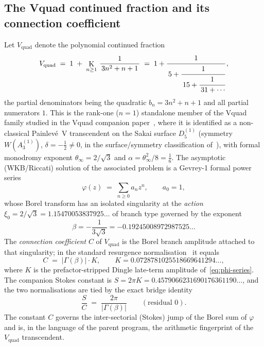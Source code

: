 \documentclass[11pt,reqno]{amsart}
\renewcommand{\_}{\vquadorigunderscore\allowbreak}
\theoremstyle{plain}
\theoremstyle{definition}
\newcommand{\Vquad}{V_{\mathrm{quad}}}
\newcommand{\xizero}{\xi_0}
\providecommand{\C}{}\renewcommand{\C}{C}
\DeclareMathOperator*{\K}{K}
\begin{document}
\subsection{The V\_quad continued fraction and its connection coefficient}
Let $\Vquad$ denote the polynomial continued fraction
\begin{equation}\label{eq:vquad-pcf}
  \Vquad \;=\; 1 \;+\; \K_{n\ge 1}\,\frac{1}{\,3n^{2}+n+1\,}
  \;=\; 1+\cfrac{1}{\,5+\cfrac{1}{\,15+\cfrac{1}{\,31+\cdots}}}\,,
\end{equation}
the partial denominators being the quadratic $b_n=3n^2+n+1$ and all partial numerators $1$.
This is the rank-one ($n=1$) standalone member of the V\_quad family studied in the V\_quad
companion paper~\cite{Vquad}, where it is identified as a non-classical Painlev\'e~V
transcendent on the Sakai surface $D_5^{(1)}$ (symmetry $W(A_3^{(1)})$, $\delta=-\tfrac12\ne0$,
in the surface/symmetry classification of~\cite{SakaiClass}),
with formal monodromy exponent $\theta_\infty=2/\sqrt3$ and $\alpha=\theta_\infty^2/8=\tfrac16$.
The asymptotic (WKB/Riccati) solution of the associated problem is a Gevrey-1 formal power
series
\begin{equation}\label{eq:phi-series}
  \varphi(z)\;=\;\sum_{n\ge 0} a_n z^n ,\qquad a_0=1,
\end{equation}
whose Borel transform has an isolated singularity at the \emph{action}
$\xizero=2/\sqrt3=1.15470053837925\ldots$ of branch type governed by the exponent
\begin{equation}\label{eq:beta}
  \beta=-\frac{1}{3\sqrt3}=-0.19245008972987525\ldots
\end{equation}
The \emph{connection coefficient} $\C$ of $\Vquad$ is the Borel branch amplitude attached to
that singularity; in the standard resurgence normalisation~\cite{Dingle,BerryHowls,StokesNote}
it equals
\begin{equation}\label{eq:C-skeleton}
  \C \;=\; \lvert\Gamma(\beta)\rvert\cdot K,\qquad
  K=0.0728781025518669641294\ldots,
\end{equation}
where $K$ is the prefactor-stripped Dingle late-term amplitude of~\eqref{eq:phi-series}. The
companion Stokes constant is $S=2\pi K=0.4579066231690176361190\ldots$, and the two normalisations
are tied by the exact bridge identity
\begin{equation}\label{eq:bridge}
  \frac{S}{\C}\;=\;\frac{2\pi}{\lvert\Gamma(\beta)\rvert}\qquad(\text{residual }0).
\end{equation}
The constant $\C$ governs the inter-sectorial (Stokes) jump of the Borel sum of $\varphi$ and is,
in the language of the parent program, the arithmetic fingerprint of the $\Vquad$ transcendent.
\end{document}
